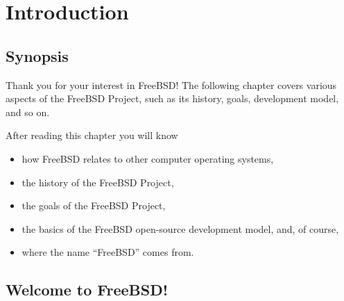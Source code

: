 \chapter{Introduction}

\section{Synopsis}

Thank you for your interest in FreeBSD! The following chapter covers various
aspects of the FreeBSD Project, such as its history, goals, development model,
and so on.

After reading this chapter you will know
\begin{itemize}
\item
   how FreeBSD relates to other computer operating systems,
\item
   the history of the FreeBSD Project,
\item
   the goals of the FreeBSD Project,
\item
   the basics of the FreeBSD open-source development model, and, of course,
\item
   where the name ``FreeBSD'' comes from.
\end{itemize}



\section{Welcome to FreeBSD!}